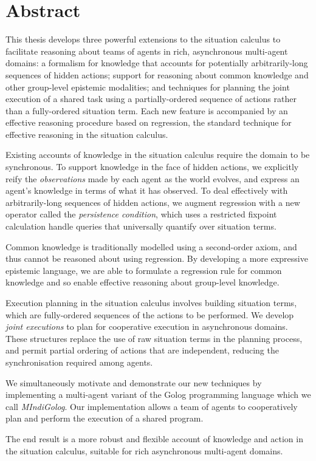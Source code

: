 


\chapter*{Abstract}

This thesis develops three powerful extensions to the situation calculus
to facilitate reasoning about teams of agents in rich, asynchronous
multi-agent domains: a formalism for knowledge that accounts for potentially
arbitrarily-long sequences of hidden actions; support for reasoning
about common knowledge and other group-level epistemic modalities;
and techniques for planning the joint execution of a shared task using
a partially-ordered sequence of actions rather than a fully-ordered
situation term. Each new feature is accompanied by an effective reasoning
procedure based on regression, the standard technique for effective
reasoning in the situation calculus.

Existing accounts of knowledge in the situation calculus require the
domain to be synchronous. To support knowledge in the face of hidden
actions, we explicitly reify the \emph{observations} made by each
agent as the world evolves, and express an agent's knowledge in terms
of what it has observed. To deal effectively with arbitrarily-long
sequences of hidden actions, we augment regression with a new operator
called the \emph{persistence condition}, which uses a restricted fixpoint
calculation handle queries that universally quantify over situation
terms.

Common knowledge is traditionally modelled using a second-order axiom,
and thus cannot be reasoned about using regression. By developing
a more expressive epistemic language, we are able to formulate a regression
rule for common knowledge and so enable effective reasoning about
group-level knowledge.

Execution planning in the situation calculus involves building situation
terms, which are fully-ordered sequences of the actions to be performed.
We develop \emph{joint executions} to plan for cooperative execution
in asynchronous domains. These structures replace the use of raw situation
terms in the planning process, and permit partial ordering of actions
that are independent, reducing the synchronisation required among
agents.

We simultaneously motivate and demonstrate our new techniques by implementing
a multi-agent variant of the Golog programming language which we call
\emph{MIndiGolog}. Our implementation allows a team of agents to cooperatively
plan and perform the execution of a shared program.

The end result is a more robust and flexible account of knowledge
and action in the situation calculus, suitable for rich asynchronous
multi-agent domains.

